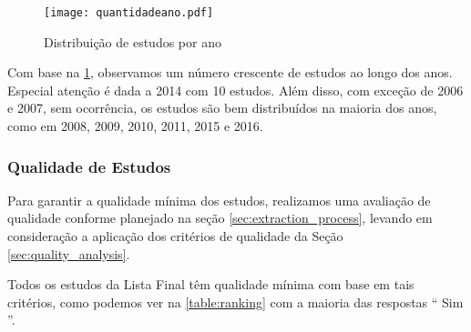 \begin{figure}[!h]
	\centering
	\texttt{[image: quantidadeano.pdf]}
	\caption{Distribuição de estudos por ano}
	\label{fig:qtdano}
\end{figure}

Com base na \ref{fig:qtdano}, observamos um número crescente de estudos ao longo dos anos. Especial atenção é dada a 2014 com 10 estudos. Além disso, com exceção de 2006 e 2007, sem ocorrência, os estudos são bem distribuídos na maioria dos anos, como em 2008, 2009, 2010, 2011, 2015 e 2016.

\subsubsection{Qualidade de Estudos}

Para garantir a qualidade mínima dos estudos, realizamos uma avaliação de qualidade conforme planejado na seção \ref{sec:extraction_process}, levando em consideração a aplicação dos critérios de qualidade da Seção \ref{sec:quality_analysis}.

Todos os estudos da Lista Final têm qualidade mínima com base em tais critérios, como podemos ver na  \ref{table:ranking} com a maioria das respostas `` Sim ''.

